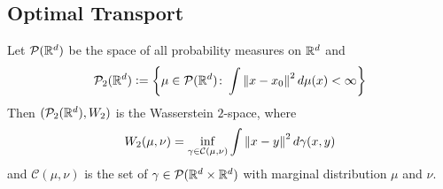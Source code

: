 \documentclass[a4paper,12pt]{article}
\begin{document}
\subsection{Optimal Transport}
Let $\mathcal{P}(\mathbb{R}^d)$ be the space of all probability measures on $\mathbb{R}^d$ and 
\begin{equation*}
  \mathcal{P}_2(\mathbb{R}^d) \vcentcolon= \left\{\mu \in \mathcal{P}(\mathbb{R}^d) \colon \int \left\lVert x-x_0\right\lVert^2d\mu(x) < \infty\right\}
\end{equation*}
Then $(\mathcal{P}_2(\mathbb{R}^d), W_2)$ is the Wasserstein $2$-space, where
\begin{equation*}
  W_2(\mu,\nu) = \inf_{\gamma \in \mathcal{C}(\mu,\nu)}\int \left\lVert x-y\right\lVert^2d\gamma(x,y)
\end{equation*}
and $\mathcal{C}(\mu,\nu)$ is the set of $\gamma \in \mathcal{P}(\mathbb{R}^d\times \mathbb{R}^d)$ with marginal distribution $\mu$ and $\nu$.
\end{document}
